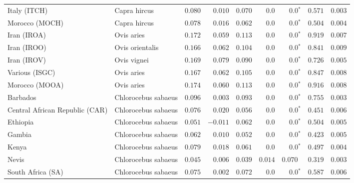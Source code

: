 \begin{center}
\begin{adjustbox}{width = 1\textwidth}
\begin{tabular}{|l|l|r|r|r|r|r|r|r|}
            Italy (ITCH)                    & Capra hircus          & $ 0.080$ & $ 0.010$ & $ 0.070$ & $0.0$    & $\bm{0.0{^*}}$    & $ 0.571$ & $ 0.003$ \\
            Morocco (MOCH)                    & Capra hircus     & $ 0.078$ & $ 0.016$ & $ 0.062$ & $0.0$    & $\bm{0.0{^*}}$    & $ 0.504$ & $ 0.004$ \\
            Iran (IROA)                    & Ovis aries         & $ 0.172$ & $ 0.059$ & $ 0.113$ & $0.0$    & $\bm{0.0{^*}}$    & $ 0.919$ & $ 0.007$ \\
            Iran (IROO)                 & Ovis orientalis          & $ 0.166$ & $ 0.062$ & $ 0.104$ & $0.0$    & $\bm{0.0{^*}}$    & $ 0.841$ & $ 0.009$ \\
            Iran (IROV)                 & Ovis vignei          & $ 0.169$ & $ 0.079$ & $ 0.090$ & $0.0$    & $\bm{0.0{^*}}$    & $ 0.726$ & $ 0.005$ \\
            Various (ISGC)                       & Ovis aries & $ 0.167$ & $ 0.062$ & $ 0.105$ & $0.0$    & $\bm{0.0{^*}}$    & $ 0.847$ & $ 0.008$ \\
            Morocco (MOOA) & Ovis aries & $ 0.174$ & $ 0.060$ & $ 0.113$ & $0.0$ & $\bm{0.0{^*}}$ & $ 0.916$ & $ 0.008$ \\
            Barbados                       & Chlorocebus sabaeus & $ 0.096$ & $ 0.003$ & $ 0.093$ & $0.0$    & $\bm{0.0{^*}}$    & $ 0.755$ & $ 0.003$ \\
            Central African Republic (CAR)                         & Chlorocebus sabaeus & $ 0.076$ & $ 0.020$ & $ 0.056$ & $0.0$    & $\bm{0.0{^*}}$    & $ 0.451$ & $ 0.006$ \\
            Ethiopia                          & Chlorocebus sabaeus & $ 0.051$ & $-0.011$ & $ 0.062$ & $0.0$    & $\bm{0.0{^*}}$    & $ 0.504$ & $ 0.005$ \\
            Gambia                          & Chlorocebus sabaeus & $ 0.062$ & $ 0.010$ & $ 0.052$ & $0.0$ & $\bm{0.0{^*}}$        & $ 0.423$ & $ 0.005$ \\
            Kenya              & Chlorocebus sabaeus & $ 0.079$ & $ 0.018$ & $ 0.061$ & $0.0$    & $\bm{0.0{^*}}$ & $ 0.497$ & $ 0.004$ \\
            Nevis               & Chlorocebus sabaeus & $ 0.045$ & $ 0.006$ & $ 0.039$ & $ 0.014$ & $ 0.070~~$ & $ 0.319$ & $ 0.003$ \\
            South Africa (SA)                         & Chlorocebus sabaeus & $ 0.075$ & $ 0.002$ & $ 0.072$ & $0.0$    & $\bm{0.0{^*}}$    & $ 0.587$ & $ 0.006$ \\

\end{tabular}
\end{adjustbox}
\end{center}
